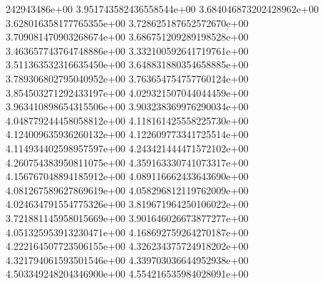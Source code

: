 242943486e+00	3.951743582436558544e+00	3.684046873202428962e+00	3.628016358177765355e+00	3.728625187652572670e+00	3.709081470903268674e+00	3.686751209289198528e+00	3.463657743764748886e+00	3.332100592641719761e+00	3.511363532316635450e+00	3.648831880354658885e+00	3.789306802795040952e+00	3.763654754757760124e+00	3.854503271292433197e+00	4.029321507044044459e+00	3.963410898654315506e+00	3.903238369976290034e+00	4.048779244458058812e+00	4.118161425558225730e+00	4.124009635936260132e+00	4.122609773341725514e+00	4.114934402598957597e+00	4.243421444471572102e+00	4.260754383950811075e+00	4.359163330741073317e+00	4.156767048894185912e+00	4.089116662433643690e+00	4.081267589627869619e+00	4.058296812119762009e+00	4.024634791554775326e+00	3.819671964250106022e+00	3.721881145958015669e+00	3.901646026673877277e+00	4.051325953913230471e+00	4.168692759264270187e+00	4.222164507723506155e+00	4.326234375724918202e+00	4.321794061593501546e+00	4.339703036644952938e+00	4.503349248204346900e+00	4.554216535984028091e+00
